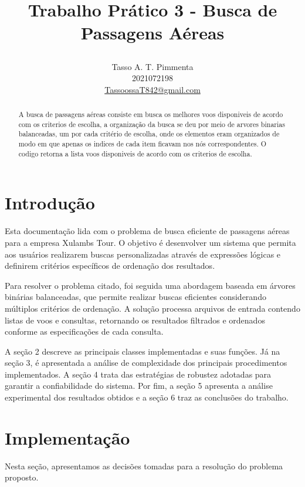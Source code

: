 \documentclass[a4paper,12pt]{article}
\title{
    \begin{center}
    \textbf{\fontsize{12}{14} \selectfont Trabalho Prático 3 - Busca de Passagens Aéreas}
    \end{center}
}
\author{Tasso A. T. Pimmenta \\ 2021072198 \\ \href{mailto:TassoossaT842@gmail.com}{TassoossaT842@gmail.com}}
\begin{document}
\maketitle

\tableofcontents

\begin{abstract}
A busca de passagens aéreas consiste em busca os melhores voos disponiveis de acordo com os criterios de escolha,
a organização da busca se deu por meio de arvores binarias balanceadas, um por cada critério de escolha,
onde os elementos eram organizados de modo em que apenas os indices de cada item ficavam nos nós correspondentes.
O codigo retorna a lista voos disponiveis de acordo com os criterios de escolha.
\end{abstract}

\newpage

\section{Introdução}\hspace*{1cm}
Esta documentação lida com o problema de busca eficiente de passagens aéreas para a empresa Xulambs Tour. O objetivo é desenvolver um sistema que permita aos usuários realizarem buscas personalizadas através de expressões lógicas e definirem critérios específicos de ordenação dos resultados.

Para resolver o problema citado, foi seguida uma abordagem baseada em árvores binárias balanceadas, que permite realizar buscas eficientes considerando múltiplos critérios de ordenação. A solução processa arquivos de entrada contendo listas de voos e consultas, retornando os resultados filtrados e ordenados conforme as especificações de cada consulta.

A seção 2 descreve as principais classes implementadas e suas funções. Já na seção 3, é apresentada a análise de complexidade dos principais procedimentos implementados. A seção 4 trata das estratégias de robustez adotadas para garantir a confiabilidade do sistema. Por fim, a seção 5 apresenta a análise experimental dos resultados obtidos e a seção 6 traz as conclusões do trabalho.

\section{Implementação}\hspace*{1cm}
Nesta seção, apresentamos as decisões tomadas para a resolução do problema proposto.
\end{document}
